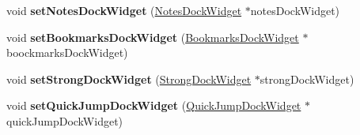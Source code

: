 \begin{DoxyCompactItemize}
\item 
\hypertarget{classAdvancedInterface_aa6d01d20825d5a1fb8b3dcc2910a057c}{
void {\bfseries setNotesDockWidget} (\hyperlink{classNotesDockWidget}{NotesDockWidget} $\ast$notesDockWidget)}
\label{classAdvancedInterface_aa6d01d20825d5a1fb8b3dcc2910a057c}

\item 
\hypertarget{classAdvancedInterface_a2733e387298544061b295616f998655d}{
void {\bfseries setBookmarksDockWidget} (\hyperlink{classBookmarksDockWidget}{BookmarksDockWidget} $\ast$boockmarksDockWidget)}
\label{classAdvancedInterface_a2733e387298544061b295616f998655d}

\item 
\hypertarget{classAdvancedInterface_ad9c88bb7f43131132ffcf057aee903e0}{
void {\bfseries setStrongDockWidget} (\hyperlink{classStrongDockWidget}{StrongDockWidget} $\ast$strongDockWidget)}
\label{classAdvancedInterface_ad9c88bb7f43131132ffcf057aee903e0}

\item 
\hypertarget{classAdvancedInterface_af7596659fb0231c185d3ad00ec56ae43}{
void {\bfseries setQuickJumpDockWidget} (\hyperlink{classQuickJumpDockWidget}{QuickJumpDockWidget} $\ast$quickJumpDockWidget)}
\label{classAdvancedInterface_af7596659fb0231c185d3ad00ec56ae43}

\end{DoxyCompactItemize}
